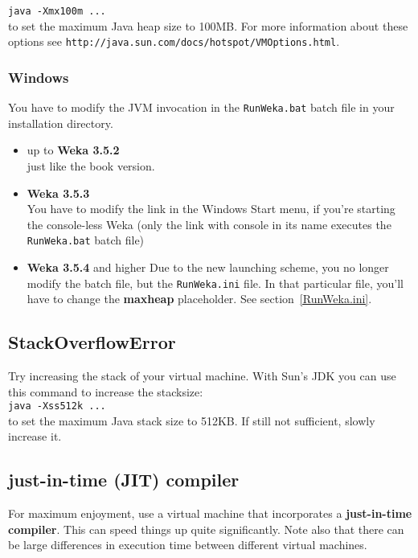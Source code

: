 \verb=java -Xmx100m ...=\\

\noindent to set the maximum Java heap size to 100MB. For more
information about these options see
\verb=http://java.sun.com/docs/hotspot/VMOptions.html=.

\subsubsection{Windows}

You have to modify the JVM invocation
in the \verb=RunWeka.bat= batch file in your installation directory.

\begin{itemize}
\item up to \textbf{Weka 3.5.2}\\
just like the book version.
\item \textbf{Weka 3.5.3}\\
You have to modify the link in the Windows Start menu, if you're starting the console-less Weka (only the link with console in its name executes the \verb=RunWeka.bat= batch file)
\item \textbf{Weka 3.5.4} and higher
Due to the new launching scheme, you no longer modify the batch file, but the \verb=RunWeka.ini= file. In that particular file, you'll have to change the \textbf{maxheap} placeholder. See section~\ref{RunWeka.ini}.
\end{itemize}

\subsection{StackOverflowError}
Try increasing the stack of your virtual machine. With Sun's JDK you
can use this command to increase the stacksize:\\

\verb=java -Xss512k ...=\\

\noindent to set the maximum Java stack size to 512KB. If still not
sufficient, slowly increase it.

\subsection{just-in-time (JIT) compiler}
For maximum enjoyment, use a virtual machine that incorporates a
\textbf{just-in-time compiler}. This can speed things up quite
significantly. Note also that there can be large differences in
execution time between different virtual machines.

